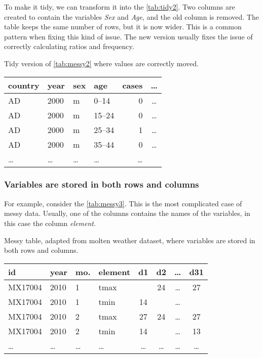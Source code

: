 To make it tidy, we can transform it into the \cref{tab:tidy2}.  Two columns are created
to contain the variables \emph{Sex} and \emph{Age}, and the old column is removed.  The
table keeps the same number of rows, but it is now wider.  This is a common pattern when
fixing this kind of issue.  The new version usually fixes the issue of correctly
calculating ratios and frequency.

\begin{tablebox}[label=tab:tidy2]{Tidy version of \cref{tab:messy2} where values are correctly moved.}
  \centering
  \begin{tabular}{l l l l r c}
    \toprule
    \textbf{country} & \textbf{year} & \textbf{sex} & \textbf{age} & \textbf{cases} & \textbf{\dots} \\
    \midrule
    AD & 2000 & m & 0--14 & 0 & \dots \\
    AD & 2000 & m & 15--24 & 0 & \dots \\
    AD & 2000 & m & 25--34 & 1 & \dots \\
    AD & 2000 & m & 35--44 & 0 & \dots \\
    \dots & \dots & \dots & \dots & \dots \\
    \bottomrule
  \end{tabular}
\end{tablebox}

\clearpage
\subsubsection{Variables are stored in both rows and columns}  For example, consider the
\cref{tab:messy3}.  This is the most complicated case of messy data.  Usually, one of the
columns contains the names of the variables, in this case the column \emph{element}.

\begin{tablebox}[label=tab:messy3]{Messy table, adapted from molten weather dataset, where variables are stored in both rows and columns.}
  \centering
  \begin{tabular}{llllcccc}
    \toprule
    \textbf{id} & \textbf{year} & \textbf{mo.} & \textbf{element} & \textbf{d1} & \textbf{d2} & \textbf{\dots} & \textbf{d31} \\
    \midrule
    MX17004 & 2010 & 1 & tmax &    & 24 & \dots & 27 \\
    MX17004 & 2010 & 1 & tmin & 14 &    & \dots &    \\
    MX17004 & 2010 & 2 & tmax & 27 & 24 & \dots & 27 \\
    MX17004 & 2010 & 2 & tmin & 14 &    & \dots & 13 \\
    \dots & \dots & \dots & \dots & \dots & \dots & \dots & \dots \\
    \bottomrule
  \end{tabular}
\end{tablebox}

